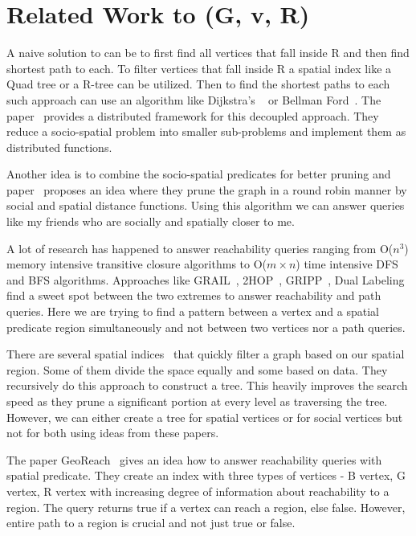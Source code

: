 \section{Related Work to {\rrp}(G, v, R)} \label{sec:relwork}
A naive solution to {\rrp} can be to first find all vertices that fall inside R and then find shortest path to each. To filter vertices that fall inside R a spatial index like a Quad tree or a R-tree can be utilized. Then to find the shortest paths to each such approach can use an algorithm like Dijkstra's ~\cite{S1990} or Bellman Ford~\cite{R1956}. The paper~\cite{NSD2013} provides a distributed framework for this decoupled approach. They reduce a socio-spatial problem into smaller sub-problems and implement them as distributed functions.

Another idea is to combine the socio-spatial predicates for better pruning and paper~\cite{KJY+2015} proposes an idea where they prune the graph in a round robin manner by social and spatial distance functions. Using this algorithm we can answer queries like my friends who are socially and spatially closer to me.

{A lot of research has happened to answer reachability queries ranging from O($n^3$}{) memory intensive transitive closure algorithms to O($m \times n$) time intensive DFS and BFS algorithms. Approaches like GRAIL~\cite{YCZ+2010}, 2HOP~\cite{CHK+2003}, GRIPP~\cite{SU2007}, Dual Labeling~\cite{HHJ+2006} find a sweet spot between the two extremes to answer reachability and path queries. Here we are trying to find a pattern between a vertex and a spatial predicate region simultaneously and not between two vertices nor a path queries. }

There are several spatial indices~\cite{PMA2001,H2006,SS2003} that quickly filter a graph based on our spatial region. Some of them divide the space equally and some based on data. They recursively do this approach to construct a tree. This heavily improves the search speed as they prune a significant portion at every level as traversing the tree. However, we can either create a tree for spatial vertices or for social vertices but not for both using ideas from these papers.

{The paper GeoReach~\cite{YM2016} gives an idea how to answer reachability queries with spatial predicate. They create an index with three types of vertices - B vertex, G vertex, R vertex with increasing degree of information about reachability to a region. The query returns true if a vertex can reach a region, else false. However, entire path to a region is crucial and not just true or false.}
